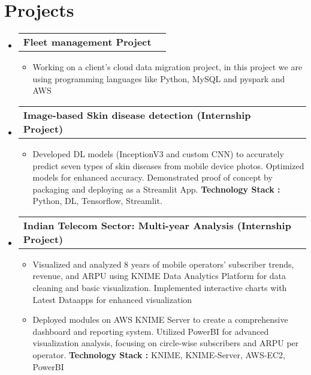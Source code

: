 \documentclass[letterpaper,11pt]{article}
\makeatletter
\newcommand{\resumeItem}[1]{
  \item\small{
    {#1 \vspace{-2pt}}
  }
}
\newcommand{\resumeProjectHeading}[2]{
    \vspace{-2pt}\item
    \begin{tabular*}{0.97\textwidth}{l@{\extracolsep{\fill}}r}
      \small#1 & #2 \\
    \end{tabular*}\vspace{-7pt}
}
\newcommand{\resumeSubHeadingListStart}{\begin{itemize}[leftmargin=0.15in, label={}]}
\newcommand{\resumeSubHeadingListEnd}{\end{itemize}}
\newcommand{\resumeItemListStart}{\begin{itemize}}
\newcommand{\resumeItemListEnd}{\end{itemize}\vspace{-5pt}}
\makeatother
\begin{document}

\section{Projects}
    \vspace{3pt}
    \resumeSubHeadingListStart
      
      \resumeProjectHeading
        {\textbf{Fleet management Project}}{}
          \resumeItemListStart
            \resumeItem{Working on a client’s cloud data migration project, in this project we are using programming languages like Python, MySQL and pyspark and AWS}
          \resumeItemListEnd
      
      \resumeProjectHeading
        {\textbf{Image-based Skin disease detection (Internship Project)}}{}
          \resumeItemListStart
            \resumeItem{Developed DL models (InceptionV3 and custom CNN) to accurately predict seven types of skin diseases from mobile device photos. Optimized models for enhanced accuracy. Demonstrated proof of concept by packaging and deploying as a Streamlit App. \textbf{Technology Stack :} Python, DL, Tensorflow, Streamlit.}
          \resumeItemListEnd
      
      \resumeProjectHeading
        {\textbf{Indian Telecom Sector: Multi-year Analysis (Internship Project)}}{}
          \resumeItemListStart
            \resumeItem{ Visualized and analyzed 8 years of mobile operators' subscriber trends, revenue, and ARPU using KNIME Data Analytics Platform for data cleaning and basic visualization. Implemented interactive charts with Latest Dataapps for enhanced visualization}
            \resumeItem{ Deployed modules on AWS KNIME Server to create a comprehensive dashboard and reporting system. Utilized PowerBI for advanced visualization analysis, focusing on circle-wise subscribers and ARPU per operator. \textbf{Technology Stack :} KNIME, KNIME-Server, AWS-EC2, PowerBI}
          \resumeItemListEnd
      
    \resumeSubHeadingListEnd



\end{document}
